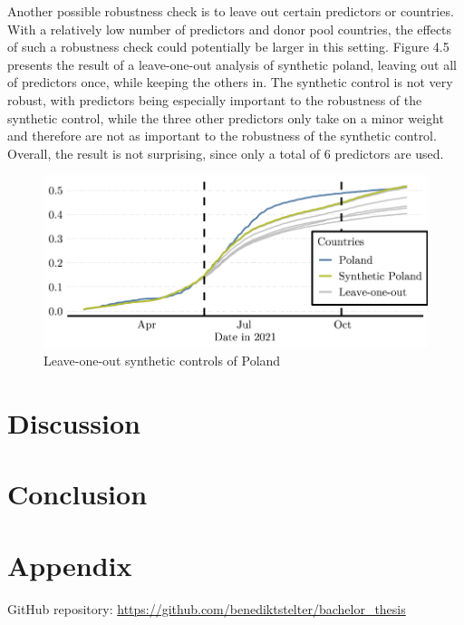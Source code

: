 \documentclass{scrbook}
\begin{document}
Another possible robustness check is to leave out certain predictors or
countries. With a relatively low number of predictors and donor pool
countries, the effects of such a robustness check could potentially be
larger in this setting. Figure 4.5 presents the result of a
leave-one-out analysis of synthetic poland, leaving out all of
predictors once, while keeping the others in. The synthetic control is
not very robust, with predictors being especially important to the
robustness of the synthetic control, while the three other predictors
only take on a minor weight and therefore are not as important to the
robustness of the synthetic control. Overall, the result is not
surprising, since only a total of 6 predictors are used.

\begin{figure}[h]
\caption{Leave-one-out synthetic controls of Poland}

\begin{center}\includegraphics{bachelor_thesis_files/figure-latex/unnamed-chunk-6-1} \end{center}
\end{figure}

\chapter{Discussion}

\chapter{Conclusion}


 
\backmatter

 
\chapter{Appendix}
GitHub repository: \url{https://github.com/benediktstelter/bachelor_thesis}
\end{document}
